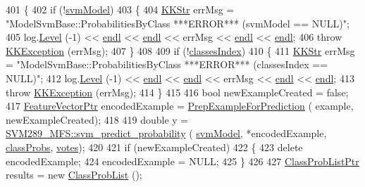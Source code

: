 \begin{DoxyCode}
401 \{
402   \textcolor{keywordflow}{if}  (!\hyperlink{class_k_k_m_l_l_1_1_model_svm_base_a8f6ed793dfaa080ddea8e1776d2ee755}{svmModel})
403   \{
404     \hyperlink{class_k_k_b_1_1_k_k_str}{KKStr} errMsg = \textcolor{stringliteral}{"ModelSvmBase::ProbabilitiesByClass   ***ERROR***      (svmModel == NULL)"};
405     log.\hyperlink{class_k_k_b_1_1_run_log_a32cf761d7f2e747465fd80533fdbb659}{Level} (-1) << \hyperlink{namespace_k_k_b_ad1f50f65af6adc8fa9e6f62d007818a8}{endl} << \hyperlink{namespace_k_k_b_ad1f50f65af6adc8fa9e6f62d007818a8}{endl} << errMsg << \hyperlink{namespace_k_k_b_ad1f50f65af6adc8fa9e6f62d007818a8}{endl} << \hyperlink{namespace_k_k_b_ad1f50f65af6adc8fa9e6f62d007818a8}{endl};
406     \textcolor{keywordflow}{throw} \hyperlink{class_k_k_b_1_1_k_k_exception}{KKException} (errMsg);
407   \}
408 
409   \textcolor{keywordflow}{if}  (!\hyperlink{class_k_k_m_l_l_1_1_model_adbb9475e16bb2c3eef52170485e3018e}{classesIndex})
410   \{
411     \hyperlink{class_k_k_b_1_1_k_k_str}{KKStr} errMsg = \textcolor{stringliteral}{"ModelSvmBase::ProbabilitiesByClass   ***ERROR***      (classesIndex == NULL)"};
412     log.\hyperlink{class_k_k_b_1_1_run_log_a32cf761d7f2e747465fd80533fdbb659}{Level} (-1) << \hyperlink{namespace_k_k_b_ad1f50f65af6adc8fa9e6f62d007818a8}{endl} << \hyperlink{namespace_k_k_b_ad1f50f65af6adc8fa9e6f62d007818a8}{endl} << errMsg << \hyperlink{namespace_k_k_b_ad1f50f65af6adc8fa9e6f62d007818a8}{endl} << \hyperlink{namespace_k_k_b_ad1f50f65af6adc8fa9e6f62d007818a8}{endl};
413     \textcolor{keywordflow}{throw} \hyperlink{class_k_k_b_1_1_k_k_exception}{KKException} (errMsg);
414   \}
415 
416   \textcolor{keywordtype}{bool}  newExampleCreated = \textcolor{keyword}{false};
417   \hyperlink{class_k_k_m_l_l_1_1_feature_vector}{FeatureVectorPtr}  encodedExample = \hyperlink{class_k_k_m_l_l_1_1_model_a31b972adfb64769b3ae966debec824fd}{PrepExampleForPrediction} (
      example, newExampleCreated);
418 
419   \textcolor{keywordtype}{double}  y = \hyperlink{namespace_s_v_m289___m_f_s_ac0623d29bd02989f751e50d1cb3c8855}{SVM289\_MFS::svm\_predict\_probability} (
      \hyperlink{class_k_k_m_l_l_1_1_model_svm_base_a8f6ed793dfaa080ddea8e1776d2ee755}{svmModel},  *encodedExample, \hyperlink{class_k_k_m_l_l_1_1_model_a9d51bc464ab7049659aeea120bf9db26}{classProbs}, \hyperlink{class_k_k_m_l_l_1_1_model_a7d13e2ff97ace39ec4423fd4bfa9ecf2}{votes});
420 
421   \textcolor{keywordflow}{if}  (newExampleCreated)
422   \{
423     \textcolor{keyword}{delete} encodedExample;
424     encodedExample = NULL;
425   \}
426 
427   \hyperlink{class_k_k_m_l_l_1_1_class_prob_list}{ClassProbListPtr}  results = \textcolor{keyword}{new} \hyperlink{class_k_k_m_l_l_1_1_class_prob_list}{ClassProbList} ();

\end{DoxyCode}
